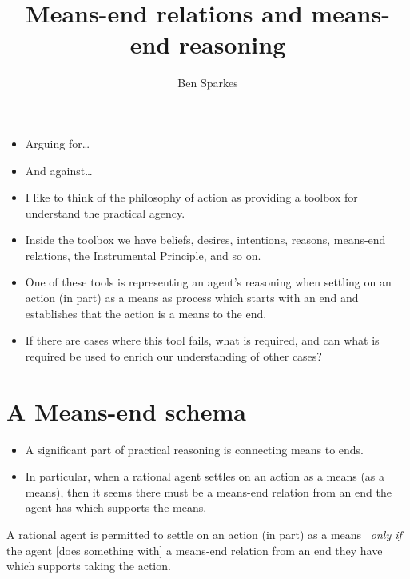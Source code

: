 \documentclass[10pt]{article}
\title{Means-end relations and means-end reasoning}
\author{Ben Sparkes}
\newenvironment{beamerblock}[1]{%
  \tcolorbox[standard,%
  no shadow,
  noparskip,
  colback=white,
  colframe=black,
  colbacktitle=white,
  coltitle=black,
  colupper=black,
  size=small,
  boxrule=.125mm,
  fonttitle=\bfseries,
  sharp corners=all,
  title=#1]}%
{\endtcolorbox}
\newcommand{\hozlinedash}[0]{%
  \noindent\hdashrule[0.5ex][c]{\textwidth}{.1pt}{2.5pt}
}
\begin{document}

\tableofcontents

\newpage

\maketitle

\hozlinedash

\begin{itemize}
\item Arguing for\dots
\item And against\dots
\end{itemize}

\hozlinedash

\begin{itemize}[noitemsep]
\item I like to think of the philosophy of action as providing a toolbox for understand the practical agency.
\item Inside the toolbox we have beliefs, desires, intentions, reasons, means-end relations, the Instrumental Principle, and so on.
\item One of these tools is representing an agent's reasoning when settling on an action (in part) as a means as process which starts with an end and establishes that the action is a means to the end.
\item If there are cases where this tool fails, what is required, and can what is required be used to enrich our understanding of other cases?
\end{itemize}



\newpage

\section{A Means-end schema}
\label{sec:means-end-schema}


\begin{itemize}
\item A significant part of practical reasoning is connecting means to ends.
\item In particular, when a rational agent settles on an action as a means (as a means), then it seems there must be a means-end relation from an end the agent has which supports the means.
\end{itemize}

\begin{beamerblock}{Means-end schema}
  A rational agent is permitted to settle on an action (in part) as a means
  \newline
  \mbox{ }\hfill\emph{only if}\hfill\mbox{ }
  \newline
  the agent [{does something with}] a means-end relation from an end they have which supports taking the action.
\end{beamerblock}
\end{document}
